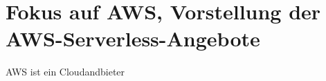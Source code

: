 \documentclass[
12pt,
english,
ngerman,
headsepline,
twoside,
openright,
numbers=noenddot,version=first
]{scrreprt}
\begin{document}







\chapter{Fokus auf AWS, Vorstellung der AWS-Serverless-Angebote}
\label{chap:aws-serverless}
\acrshort{AWS} ist ein Cloudandbieter
\end{document}
